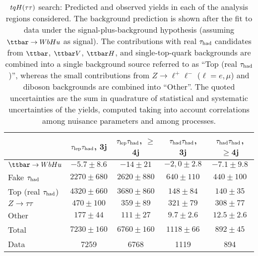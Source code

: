 \begin{table}[htbp]
\caption{
$tqH(\tau\tau)$ search: Predicted and observed yields in each of the analysis regions considered.
The background prediction is shown after the fit to data under the signal-plus-background hypothesis 
(assuming $\Hu$ as signal).
The contributions with real $\tau_{\mathrm{had}}$ candidates from $\ttbar$,  $\ttbar V$, $\ttbar H$, and single-top-quark backgrounds are combined into
a single background source referred to as ``Top (real $\tau_{\mathrm{had}}$)'', whereas the small contributions from 
$Z\to \ell^+\ell^-$ ($\ell = e, \mu$) and diboson backgrounds are combined into ``Other''. 
The quoted uncertainties are the sum in quadrature of statistical and systematic uncertainties of the yields, 
computed taking into account correlations among nuisance parameters and among processes.
}
\small
\begin{center}
\begin{tabular}{l*{4}{c}}
\hline\hline
 & $\tau_{\mathrm{lep}} \tau_{\mathrm{had}}$, 3j & $\tau_{\mathrm{lep}} \tau_{\mathrm{had}}$, $\geq$4j & $\tau_{\mathrm{had}} \tau_{\mathrm{had}}$, 3j &  $\tau_{\mathrm{had}} \tau_{\mathrm{had}}$, $\geq$4j \\
\hline
$\Hu$  &   $ -5.7 \pm 8.6 $ &   $ -14 \pm 21 $ &   $ -2,0 \pm 2.8 $ &   $ -7.1 \pm 9.8 $ \\ 
\hline
Fake $\tau_{\mathrm{had}}$  &   $ 2270 \pm 680 $ &   $ 2620 \pm 880 $ &   $ 640 \pm 110 $ &   $ 440 \pm 100 $ \\
Top (real $\tau_{\mathrm{had}}$)  &   $ 4320 \pm 660 $ &   $ 3680 \pm 860 $ &   $ 148 \pm 84 $ &   $ 140 \pm 35 $ \\ 
$Z \to \tau\tau$  &   $ 470 \pm 100 $ &   $ 359 \pm 89 $ &   $ 321 \pm 79 $ &   $ 308 \pm 77 $ \\ 
Other  &   $ 177 \pm 44 $ &   $ 111 \pm 27 $ &   $ 9.7 \pm 2.6 $ &   $ 12.5 \pm 2.6 $ \\ 
\hline
Total  &   $ 7230 \pm 160 $ &   $ 6760 \pm 160 $ &   $ 1118 \pm 66 $ &   $ 892 \pm 45 $ \\ 
\hline
Data  & 7259  & 6768  & 1119  & 894  \\ 
\hline\hline    
\end{tabular}
%
\end{center}
\label{tab:Htautau_Postfit_Yields_Unblind_Hu}
\end{table} 

